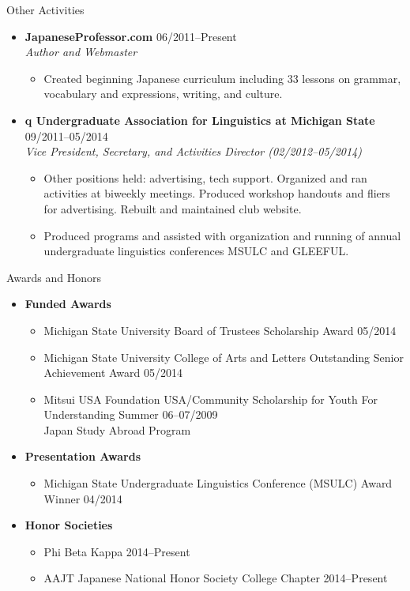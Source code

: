 \documentclass[10pt,oneside]{article}
\newenvironment{ressection}[1]{
	{\Large#1}
	\begin{itemize}
}{
	\end{itemize}
}
\newcommand{\resbigitem}[4]{
	\item
	\textbf{#1} \hfill #2 \\
	\textit{#3} \hfill \textit{#4}
}
\newenvironment{ressubsec}[4]{
	\resbigitem{#1}{#2}{#3}{#4}
	\begin{itemize}
}{
	\end{itemize}
}
\newenvironment{reslist}[1]{
	\item{\textbf{#1}}
	\begin{itemize}
}{
	\end{itemize}
}
\begin{document}
\begin{ressection}{Other Activities}
	\begin{ressubsec}{JapaneseProfessor.com}{06/2011--Present}{Author and Webmaster}{}
		\item{Created beginning Japanese curriculum including 33 lessons on grammar, vocabulary and expressions, writing, and culture.}
	\end{ressubsec}
	
	\begin{ressubsec}{q Undergraduate Association for Linguistics at Michigan State}
			{09/2011--05/2014}
			{Vice President, Secretary, and Activities Director (02/2012--05/2014)}
			{}
		\item{Other positions held: advertising, tech support. Organized and ran activities at biweekly meetings. Produced workshop handouts and fliers for advertising. Rebuilt and maintained club website.}
		\item{Produced programs and assisted with organization and running of annual undergraduate linguistics conferences MSULC and GLEEFUL. }
	\end{ressubsec}
\end{ressection}


\begin{ressection}{Awards and Honors}
	\begin{reslist}{Funded Awards}
		\item{Michigan State University Board of Trustees Scholarship Award \hfill 05/2014}
		\item{Michigan State University College of Arts and Letters Outstanding Senior Achievement Award \hfill 05/2014}
		\item{Mitsui USA Foundation USA/Community Scholarship for Youth For Understanding Summer \hfill 06--07/2009 \\ Japan Study Abroad Program}
	\end{reslist}
	
	\begin{reslist}{Presentation Awards}
		\item{Michigan State Undergraduate Linguistics Conference (MSULC) Award Winner \hfill 04/2014}
	\end{reslist}
	
	\begin{reslist}{Honor Societies}
		\item{Phi Beta Kappa \hfill 2014--Present}
		\item{AAJT Japanese National Honor Society College Chapter \hfill 2014--Present}	
	\end{reslist}
\end{ressection}
\end{document}

